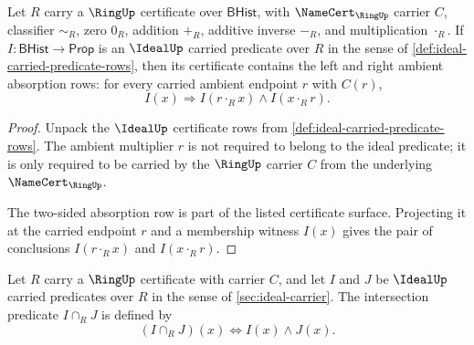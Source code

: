 \begin{theorem}
\label{thm:ideal-two-sided-absorption-obligation}
Let $R$ carry a $\RingUp$ certificate over $\mathsf{BHist}$, with $\NameCert_{\RingUp}$ carrier $C$, classifier $\sim_R$, zero $0_R$, addition $+_R$, additive inverse $-_R$, and multiplication $\cdot_R$. If $I:\mathsf{BHist}\to\mathsf{Prop}$ is an $\IdealUp$ carried predicate over $R$ in the sense of \autoref{def:ideal-carried-predicate-rows}, then its certificate contains the left and right ambient absorption rows: for every carried ambient endpoint $r$ with $C(r)$,
$$
I(x)\Longrightarrow I(r\cdot_R x)\land I(x\cdot_R r).
$$
\end{theorem}
\begin{proof}
Unpack the $\IdealUp$ certificate rows from \autoref{def:ideal-carried-predicate-rows}. The ambient multiplier $r$ is not required to belong to the ideal predicate; it is only required to be carried by the $\RingUp$ carrier $C$ from the underlying $\NameCert_{\RingUp}$.

The two-sided absorption row is part of the listed certificate surface. Projecting it at the carried endpoint $r$ and a membership witness $I(x)$ gives the pair of conclusions $I(r\cdot_R x)$ and $I(x\cdot_R r)$.
\end{proof}

\begin{definition}
\label{def:ideal-intersection-predicate}
Let $R$ carry a $\RingUp$ certificate with carrier $C$, and let $I$ and $J$ be $\IdealUp$ carried predicates over $R$ in the sense of \autoref{sec:ideal-carrier}. The intersection predicate $I\cap_RJ$ is defined by
$$
(I\cap_RJ)(x)\Longleftrightarrow I(x)\land J(x).
$$
\end{definition}


